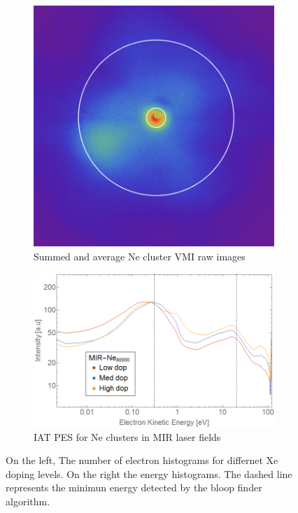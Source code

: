  
\begin{figure}[h!]
\hfill
\begin{subfigure}[l]{0.48\textwidth}\caption{Summed and average Ne cluster VMI raw images}
\includegraphics[width=1\textwidth]{../Images/results/Comparison_energyDistribution/MIR_Ne_37K.png} 
\end{subfigure} 
\begin{subfigure}[l]{0.48\textwidth}\caption{IAT PES for Ne clusters in MIR laser fields}
\includegraphics[width=1\textwidth]{../Images/results/Comparison_energyDistribution/MIR_Ne_summed_energydist.png} 
\end{subfigure} \hfill
\caption[MIR Ne-Xe doping scan.Histograms]{On the left, The number of electron histograms for differnet Xe doping levels. On the right the energy histograms. The dashed line represents the minimun energy detected by the bloop finder algorithm.}
\label{fig:Neonenegdis}
\end{figure}

